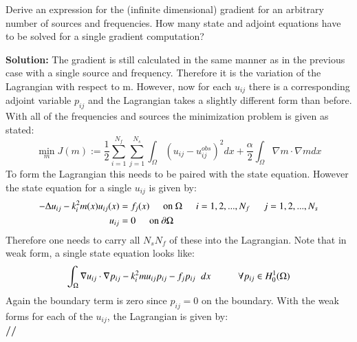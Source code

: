 \documentclass[11pt]{article}
\newenvironment{solution}{\begin{trivlist}\item[]{\bf Solution:}}
                      {\textbf{//} \end{trivlist}}
\begin{document}
\begin{enumerate}
\item[(c)] Derive an expression for the (infinite dimensional) gradient
	   for an arbitrary number of sources and frequencies. How many
	   state and adjoint equations have to be solved for a single
	   gradient computation? 


\begin{solution}
The gradient is still calculated in the same manner as in the previous
 case with a single source and frequency. Therefore it is the variation
 of the Lagrangian with respect to m. However, now for each $u_{ij}$
 there is a corresponding adjoint variable $p_{ij}$ and the Lagrangian
 takes a slightly different form than before. With all of the
 frequencies and sources the minimization problem is given as stated: 
\begin{displaymath}
\min_m J(m) :=
 \frac{1}{2}\sum_{i=1}^{N_f}\sum_{j=1}^{N_s}\int_{\Omega}\left(u_{ij} -
 u_{ij}^{obs}\right)^2 dx + \frac{\alpha}{2}\int_{\Omega}\nabla m \cdot
 \nabla m dx 
\end{displaymath}
To form the Lagrangian this needs to be paired with the state equation. However the state equation for a single $u_{ij}$ is given by:
\begin{align}
-\Delta u_{ij} - k_i^2m(x)u_{ij}(x) &= f_j(x)\hspace{5 mm} \text{on }
 \Omega \hspace{5 mm} i = 1, 2, ..., N_f \hspace{5 mm} j = 1, 2, ...,
 N_s \nonumber \\ 
u_{ij} &= 0 \hspace{5 mm} \text{on } \partial\Omega \nonumber
\end{align}
Therefore one needs to carry all $N_sN_f$ of these into the
 Lagrangian. Note that in weak form, a single state equation looks like: 
\begin{displaymath} 
\int_{\Omega}\nabla u_{ij} \cdot \nabla p_{ij} - k_i^2mu_{ij}p_{ij} -
 f_jp_{ij}\hspace{2 mm}dx \hspace{1 cm} \forall p_{ij} \in H^1_0(\Omega) 
\end{displaymath}
Again the boundary term is zero since $p_{ij} = 0$ on the boundary. With
 the weak forms for each of the $u_{ij}$, the Lagrangian is given by: 
\begin{displaymath}

\end{displaymath}
\end{solution}
\end{enumerate}
\end{document}
